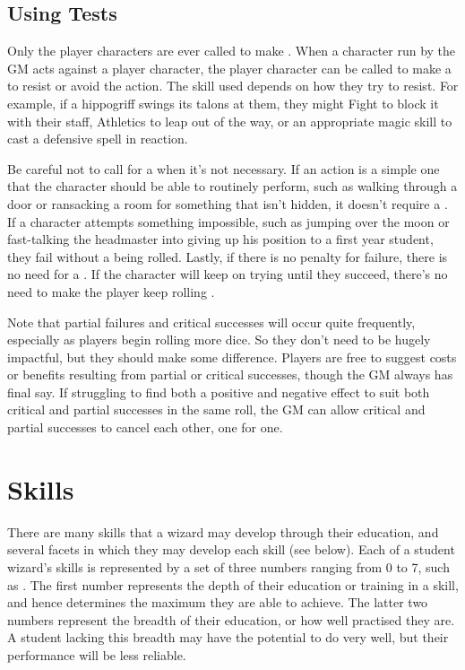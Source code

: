 \subsection{Using Tests}

Only the player characters are ever called to make {\tests}.
When a character run by the GM acts against a player character, the player character can be called to make a {\test} to resist or avoid the action.
The skill used depends on how they try to resist.
For example, if a hippogriff swings its talons at them, they might {\test} Fight to block it with their staff, {\test} Athletics to leap out of the way, or {\test} an appropriate magic skill to cast a defensive spell in reaction.

Be careful not to call for a {\test} when it's not necessary.
If an action is a simple one that the character should be able to routinely perform, such as walking through a door or ransacking a room for something that isn't hidden, it doesn't require a {\test}.
If a character attempts something impossible, such as jumping over the moon or fast-talking the headmaster into giving up his position to a first year student, they fail without a {\test} being rolled.
Lastly, if there is no penalty for failure, there is no need for a {\test}.
If the character will keep on trying until they succeed, there's no need to make the player keep rolling {\tests}.

Note that partial failures and critical successes will occur quite frequently, especially as players begin rolling more dice.
So they don't need to be hugely impactful, but they should make some difference.
Players are free to suggest costs or benefits resulting from partial or critical successes, though the GM always has final say.
If struggling to find both a positive and negative effect to suit both critical and partial successes in the same roll, the GM can allow critical and partial successes to cancel each other, one for one.

\section{Skills}

There are many skills that a wizard may develop through their education, and several facets in which they may develop each skill (see  below).
Each of a student wizard's skills is represented by a set of three numbers ranging from 0 to 7, such as .
The first number represents the depth of their education or training in a skill, and hence determines the maximum they are able to achieve.
The latter two numbers represent the breadth of their education, or how well practised they are.
A student lacking this breadth may have the potential to do very well, but their performance will be less reliable.

